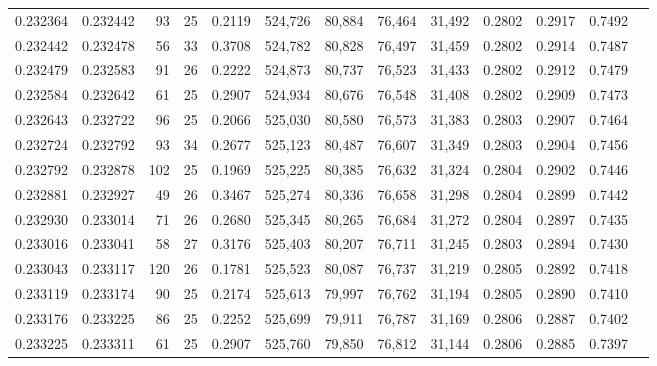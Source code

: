 \begin{tabular}{rrrrrrrrrrrrr}
0.232364 & 0.232442 &  93 &  25 &                                     0.2119 & 524,726 &  80,884 &  76,464 &  31,492 & 0.2802 & 0.2917 & 0.7492 \\
0.232442 & 0.232478 &  56 &  33 &                                     0.3708 & 524,782 &  80,828 &  76,497 &  31,459 & 0.2802 & 0.2914 & 0.7487 \\
0.232479 & 0.232583 &  91 &  26 &                                     0.2222 & 524,873 &  80,737 &  76,523 &  31,433 & 0.2802 & 0.2912 & 0.7479 \\
0.232584 & 0.232642 &  61 &  25 &                                     0.2907 & 524,934 &  80,676 &  76,548 &  31,408 & 0.2802 & 0.2909 & 0.7473 \\
0.232643 & 0.232722 &  96 &  25 &                                     0.2066 & 525,030 &  80,580 &  76,573 &  31,383 & 0.2803 & 0.2907 & 0.7464 \\
0.232724 & 0.232792 &  93 &  34 &                                     0.2677 & 525,123 &  80,487 &  76,607 &  31,349 & 0.2803 & 0.2904 & 0.7456 \\
0.232792 & 0.232878 & 102 &  25 &                                     0.1969 & 525,225 &  80,385 &  76,632 &  31,324 & 0.2804 & 0.2902 & 0.7446 \\
0.232881 & 0.232927 &  49 &  26 &                                     0.3467 & 525,274 &  80,336 &  76,658 &  31,298 & 0.2804 & 0.2899 & 0.7442 \\
0.232930 & 0.233014 &  71 &  26 &                                     0.2680 & 525,345 &  80,265 &  76,684 &  31,272 & 0.2804 & 0.2897 & 0.7435 \\
0.233016 & 0.233041 &  58 &  27 &                                     0.3176 & 525,403 &  80,207 &  76,711 &  31,245 & 0.2803 & 0.2894 & 0.7430 \\
0.233043 & 0.233117 & 120 &  26 &                                     0.1781 & 525,523 &  80,087 &  76,737 &  31,219 & 0.2805 & 0.2892 & 0.7418 \\
0.233119 & 0.233174 &  90 &  25 &                                     0.2174 & 525,613 &  79,997 &  76,762 &  31,194 & 0.2805 & 0.2890 & 0.7410 \\
0.233176 & 0.233225 &  86 &  25 &                                     0.2252 & 525,699 &  79,911 &  76,787 &  31,169 & 0.2806 & 0.2887 & 0.7402 \\
0.233225 & 0.233311 &  61 &  25 &                                     0.2907 & 525,760 &  79,850 &  76,812 &  31,144 & 0.2806 & 0.2885 & 0.7397 \\

\end{tabular}
